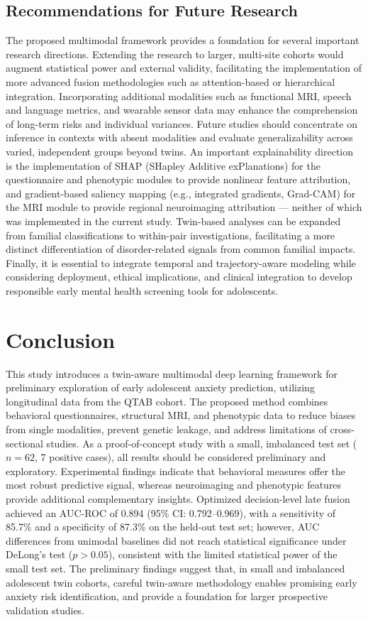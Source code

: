 \documentclass[10pt,letterpaper]{article}
\begin{document}
\subsection*{Recommendations for Future Research}
The proposed multimodal framework provides a foundation for several important research directions. Extending the research to larger, multi-site cohorts would augment statistical power and external validity, facilitating the implementation of more advanced fusion methodologies such as attention-based or hierarchical integration. Incorporating additional modalities such as functional MRI, speech and language metrics, and wearable sensor data may enhance the comprehension of long-term risks and individual variances. Future studies should concentrate on inference in contexts with absent modalities and evaluate generalizability across varied, independent groups beyond twins. An important explainability direction is the implementation of SHAP (SHapley Additive exPlanations) for the questionnaire and phenotypic modules to provide nonlinear feature attribution, and gradient-based saliency mapping (e.g., integrated gradients, Grad-CAM) for the MRI module to provide regional neuroimaging attribution — neither of which was implemented in the current study. Twin-based analyses can be expanded from familial classifications to within-pair investigations, facilitating a more distinct differentiation of disorder-related signals from common familial impacts. Finally, it is essential to integrate temporal and trajectory-aware modeling while considering deployment, ethical implications, and clinical integration to develop responsible early mental health screening tools for adolescents.

\section*{Conclusion}
This study introduces a twin-aware multimodal deep learning framework for preliminary exploration of early adolescent anxiety prediction, utilizing longitudinal data from the QTAB cohort. The proposed method combines behavioral questionnaires, structural MRI, and phenotypic data to reduce biases from single modalities, prevent genetic leakage, and address limitations of cross-sectional studies. As a proof-of-concept study with a small, imbalanced test set ($n = 62$, 7 positive cases), all results should be considered preliminary and exploratory. Experimental findings indicate that behavioral measures offer the most robust predictive signal, whereas neuroimaging and phenotypic features provide additional complementary insights. Optimized decision-level late fusion achieved an AUC-ROC of 0.894 (95\% CI: 0.792--0.969), with a sensitivity of 85.7\% and a specificity of 87.3\% on the held-out test set; however, AUC differences from unimodal baselines did not reach statistical significance under DeLong's test ($p > 0.05$), consistent with the limited statistical power of the small test set. The preliminary findings suggest that, in small and imbalanced adolescent twin cohorts, careful twin-aware methodology enables promising early anxiety risk identification, and provide a foundation for larger prospective validation studies.
\end{document}
